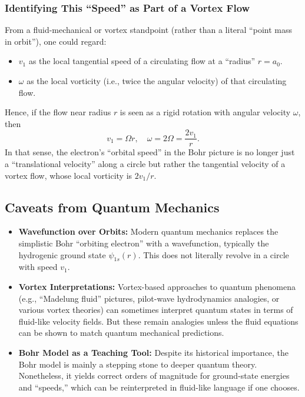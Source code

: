 \documentclass[a4paper,10pt]{article}
\begin{document}
    \subsubsection{Identifying This ``Speed'' as Part of a Vortex Flow}
    From a fluid-mechanical or vortex standpoint (rather than a literal ``point mass in orbit''), one could regard:
    \begin{itemize}
        \item $v_1$ as the local tangential speed of a circulating flow at a ``radius'' $r = a_0$.
        \item $\omega$ as the local vorticity (i.e., twice the angular velocity) of that circulating flow.
    \end{itemize}
    Hence, if the flow near radius $r$ is seen as a rigid rotation with angular velocity $\omega$, then
    \begin{equation}
        v_1 = \Omega r, \quad \omega = 2\Omega = \frac{2v_1}{r}.
    \end{equation}
    In that sense, the electron’s ``orbital speed'' in the Bohr picture is no longer just a ``translational velocity'' along a circle but rather the tangential velocity of a vortex flow, whose local vorticity is $2 v_1 / r$.

    \subsection{Caveats from Quantum Mechanics}
    \begin{itemize}
        \item \textbf{Wavefunction over Orbits:} Modern quantum mechanics replaces the simplistic Bohr ``orbiting electron'' with a wavefunction, typically the hydrogenic ground state $\psi_{1s}(r)$. This does not literally revolve in a circle with speed $v_1$.
        \item \textbf{Vortex Interpretations:} Vortex-based approaches to quantum phenomena (e.g., ``Madelung fluid'' pictures, pilot-wave hydrodynamics analogies, or various vortex theories) can sometimes interpret quantum states in terms of fluid-like velocity fields. But these remain analogies unless the fluid equations can be shown to match quantum mechanical predictions.
        \item \textbf{Bohr Model as a Teaching Tool:} Despite its historical importance, the Bohr model is mainly a stepping stone to deeper quantum theory. Nonetheless, it yields correct orders of magnitude for ground-state energies and ``speeds,'' which can be reinterpreted in fluid-like language if one chooses.
    \end{itemize}
\end{document}
